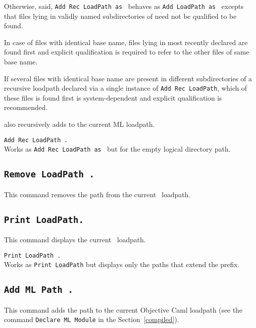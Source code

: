 Otherwise, said, {\tt Add Rec LoadPath {\str} as {\dirpath}} behaves
as {\tt Add LoadPath {\str} as {\dirpath}} excepts that files lying in
validly named subdirectories of {\str} need not be qualified to be
found.

In case of files with identical base name, files lying in most recently
declared {\dirpath} are found first and explicit qualification is
required to refer to the other files of same base name.

If several files with identical base name are present in different
subdirectories of a recursive loadpath declared via a single instance of
{\tt Add Rec LoadPath}, which of these files is found first is
system-dependent and explicit qualification is recommended.

 also recursively adds {\str} to the current ML loadpath.

\begin{Variants}
\item {\tt Add Rec LoadPath {\str}.}\\
Works as {\tt Add Rec LoadPath {\str} as {\dirpath}} but for the empty logical directory path.
\end{Variants}

\subsection[\tt Remove LoadPath {\str}.]{\tt Remove LoadPath {\str}.}
This command removes the path {\str} from the current \Coq\ loadpath.

\subsection[\tt Print LoadPath.]{\tt Print LoadPath.}
This command displays the current \Coq\ loadpath.

\begin{Variants}
\item {\tt Print LoadPath {\dirpath}.}\\
Works as {\tt Print LoadPath} but displays only the paths that extend the {\dirpath} prefix.
\end{Variants}

\subsection[\tt Add ML Path {\str}.]{\tt Add ML Path {\str}.}
This command adds the path {\str} to the current Objective Caml loadpath (see
the command {\tt Declare ML Module} in the Section~\ref{compiled}).

